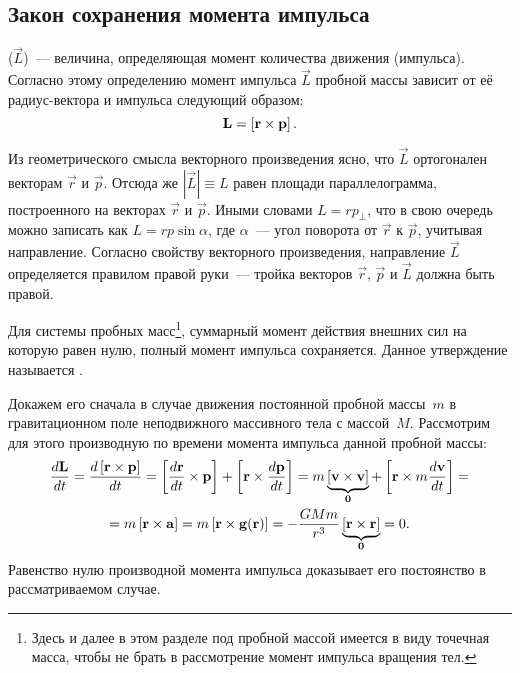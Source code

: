 \subsection{Закон сохранения момента импульса}
 ($\vec{L}$)~---  величина, определяющая момент количества движения (импульса). Согласно этому определению момент импульса $\vec{L}$ пробной массы зависит от её радиус-вектора и импульса следующий образом:
\begin{equation}
	\mathbf{L} = \left[\mathbf{r} \times \mathbf{p}\right].
\end{equation}

Из геометрического смысла векторного произведения ясно, что $\vec{L}$ ортогонален векторам $\vec{r}$ и $\vec{p}$. Отсюда же $|\vec{L}| \equiv L$ равен площади параллелограмма, построенного на векторах $\vec{r}$ и $\vec p$. Иными словами $L = rp_\perp$, что в свою очередь можно записать как $ L = r p \sin \alpha$, где $\alpha$~--- угол поворота от $\vec{r}$ к $\vec p$, учитывая направление. Согласно свойству векторного произведения, направление $\vec L$ определяется правилом правой руки~--- тройка векторов $\vec r$, $\vec p$ и $\vec L$ должна быть правой.

Для системы пробных масс\footnote{Здесь и далее в этом разделе под пробной массой имеется в виду точечная масса, чтобы не брать в рассмотрение момент импульса вращения тел.}, суммарный момент действия внешних сил на которую равен нулю, полный момент импульса сохраняется. Данное утверждение называется .

Докажем его сначала в случае движения постоянной пробной массы~$m$ в гравитационном поле неподвижного массивного тела с массой~$M$. Рассмотрим для этого производную по времени момента импульса данной пробной массы:
\begin{multline}
	\frac{d\mathbf{L}}{dt} = \frac{d\left[\mathbf{r} \times \mathbf{p}\right]}{dt} = \left[ \frac{d \mathbf{r}}{dt} \times \mathbf{p} \right] + \left[\mathbf{r} \times \frac{d\mathbf{p}}{dt} \right] = m \underbrace{\left[\mathbf{v} \times \mathbf{v}\right]}_{\mathbf{0}} + \left[\mathbf{r} \times m \frac{d\mathbf{v}}{dt} \right] = \\
	= m \left[\mathbf{r} \times \mathbf{a}\right] = m \left[\mathbf{r} \times \mathbf{g(r)}\right] =  -\frac{G M m}{r^3} \underbrace{ \left[\mathbf{r} \times \mathbf{r}\right]}_{\mathbf{0}} = 0.
\end{multline}
Равенство нулю производной момента импульса доказывает его постоянство в рассматриваемом случае.

